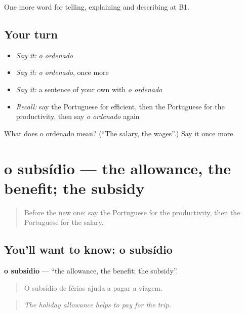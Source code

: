 \begin{grammarlens}[title={What you've built}]
One more word for telling, explaining and describing at B1.
\end{grammarlens}

\subsection*{Your turn}
\begin{itemize}
\raggedright
  \item \emph{Say it:} \emph{o ordenado}
  \item \emph{Say it:} \emph{o ordenado}, once more
  \item \emph{Say it:} a sentence of your own with \emph{o ordenado}
  \item \emph{Recall:} say the Portuguese for efficient, then the Portuguese for the productivity, then say \emph{o ordenado} again
\end{itemize}

\begin{tcolorbox}[breakable,colback=teal!4,colframe=teal!35!black,title={Before you move on}]
What does o ordenado mean? (\textquotedblleft{}The salary, the wages\textquotedblright{}.) Say it once more.
\end{tcolorbox}
\section[o subsídio]{o subsídio — the allowance, the benefit; the subsidy}

\label{lesson:PT-C362-subsidio}



\begin{quote}
Before the new one: say the Portuguese for the productivity, then the Portuguese for the salary.
\end{quote}

\subsection*{You'll want to know: o subsídio}
\textbf{o subsídio} — \textquotedblleft{}the allowance, the benefit; the subsidy\textquotedblright{}.

\begin{quote}
O subsídio de férias ajuda a pagar a viagem.
\end{quote}

\begin{quote}
\emph{The holiday allowance helps to pay for the trip.}
\end{quote}


